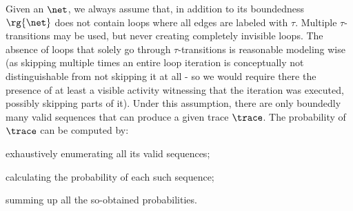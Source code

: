 %
Given an \uswn $\net$, we always assume that, in addition to its boundedness %
$\rg{\net}$ does not contain loops where all edges are labeled with $\tau$.
Multiple $\tau$-transitions may be used, but never creating completely invisible loops. {The absence of loops that solely go through $\tau$-transitions is reasonable modeling wise (as skipping multiple times an entire loop iteration is conceptually not distinguishable from not skipping it at all - so we would require there the presence of at least a visible activity witnessing that the iteration was executed, possibly skipping parts of it)}. Under this assumption, %
 there are only boundedly many valid sequences that can produce a given  trace $\trace$. The probability of $\trace$ can be computed by:
\begin{inparaenum}[\it (i)]
\item exhaustively enumerating all its valid sequences;
\item calculating the probability of each such sequence;
\item summing up all the so-obtained probabilities.
\end{inparaenum}
